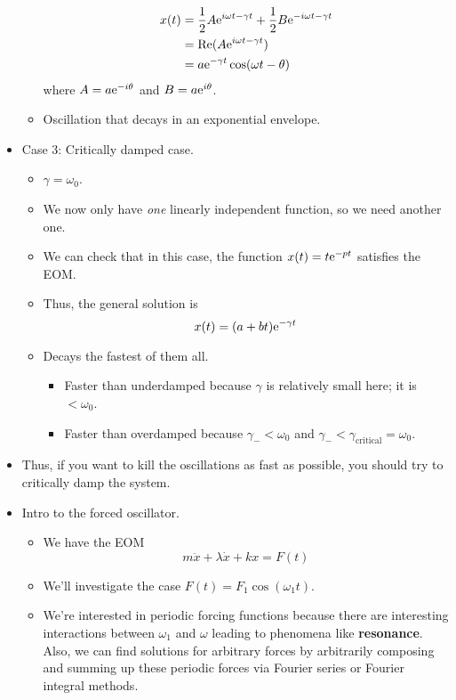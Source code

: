 \documentclass[../notes.tex]{subfiles}
\begin{document}
\begin{itemize}
\begin{itemize}
\begin{align*}
            x(t) &= \frac{1}{2}A\e[i\omega t-\gamma t]+\frac{1}{2}B\e[-i\omega t-\gamma t]\\
            &= \re(A\e[i\omega t-\gamma t])\\
            &= a\e[-\gamma t]\cos(\omega t-\theta)
        \end{align*}
        where $A=a\e[-i\theta]$ and $B=a\e[i\theta]$.
        \item Oscillation that decays in an exponential envelope.
    \end{itemize}
    \item Case 3: Critically damped case.
    \begin{itemize}
        \item $\gamma=\omega_0$.
        \item We now only have \emph{one} linearly independent function, so we need another one.
        \item We can check that in this case, the function $x(t)=t\e[-pt]$ satisfies the EOM.
        \item Thus, the general solution is
        \begin{equation*}
            x(t) = (a+bt)\e[-\gamma t]
        \end{equation*}
        \item Decays the fastest of them all.
        \begin{itemize}
            \item Faster than underdamped because $\gamma$ is relatively small here; it is $<\omega_0$.
            \item Faster than overdamped because $\gamma_-<\omega_0$ and $\gamma_-<\gamma_\text{critical}=\omega_0$.
        \end{itemize}
    \end{itemize}
    \item Thus, if you want to kill the oscillations as fast as possible, you should try to critically damp the system.
    \item Intro to the forced oscillator.
    \begin{itemize}
        \item We have the EOM
        \begin{equation*}
            m\ddot{x}+\lambda\dot{x}+kx = F(t)
        \end{equation*}
        \item We'll investigate the case $F(t)=F_1\cos(\omega_1t)$.
        \item We're interested in periodic forcing functions because there are interesting interactions between $\omega_1$ and $\omega$ leading to phenomena like \textbf{resonance}. Also, we can find solutions for arbitrary forces by arbitrarily composing and summing up these periodic forces via Fourier series or Fourier integral methods.

\end{itemize}
\end{itemize}
\end{document}
